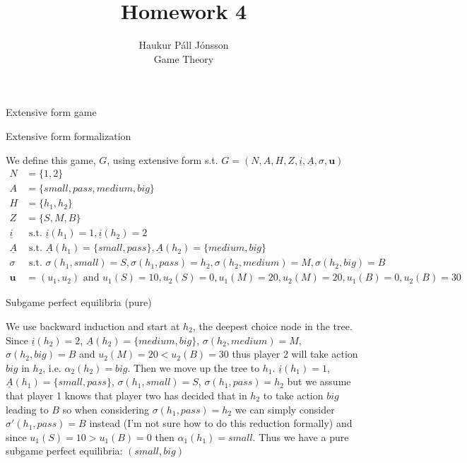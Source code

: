 \documentclass[12pt]{article}
\newenvironment{question}[2][Question]{\begin{trivlist}
\item[\hskip \labelsep {\bfseries #1}\hskip \labelsep {\bfseries #2.}]}{\end{trivlist}}
\newenvironment{answer}[2][Answer]{\begin{trivlist}
\item[\hskip \labelsep {\bfseries #1}\hskip \labelsep {\bfseries #2:}]}{\end{trivlist}}
\begin{document}
\let\oldsum\sum
\renewcommand{\sum}[3]{\oldsum\limits_{#1}^{#2}#3}
\let\oldprod\prod
\renewcommand{\prod}[3]{\oldprod\limits_{#1}^{#2}#3}

\title{Homework 4}
\author{Haukur Páll Jónsson\\
Game Theory}

\maketitle

\begin{question}{1}
Extensive form game
\end{question}
\begin{answer}{a)}{Extensive form formalization}

We define this game, $G$, using extensive form s.t. $G=(N, A, H, Z, \underline{i}, \underline{A}, \sigma, \boldsymbol{u})$
\begin{align*}
N&=\{1,2\} \\
A&=\{small,pass,medium, big\} \\
H&=\{h_1,h_2\} \\
Z&=\{S,M,B\}  \\
\underline{i}& \text{ s.t. } \underline{i}(h_1)=1, \underline{i}(h_2)=2  \\
\underline{A}& \text{ s.t. } \underline{A}(h_1)=\{small,pass\}, \underline{A}(h_2)=\{medium,big\} \\
\sigma& \text{ s.t. } \sigma(h_1,small)=S, \sigma(h_1,pass)=h_2, \sigma(h_2,medium)=M, \sigma(h_2,big)=B \\
\boldsymbol{u}&=(u_1,u_2) \text{ and } u_1(S)=10, u_2(S)=0, u_1(M)=20, u_2(M)=20, u_1(B)=0, u_2(B)=30
\end{align*}
\end{answer}
\begin{answer}{b)}{Subgame perfect equilibria (pure)}

We use backward induction and start at $h_2$, the deepest choice node in the tree. Since $\underline{i}(h_2)=2$, $\underline{A}(h_2)=\{medium,big\}$, $\sigma(h_2,medium)=M$, $\sigma(h_2,big)=B$ and $u_2(M)=20 < u_2(B)=30$ thus player 2 will take action $big$ in $h_2$, i.e. $\alpha_2(h_2)=big$. Then we move up the tree to $h_1$. $\underline{i}(h_1)=1$, $\underline{A}(h_1)=\{small,pass\}$, $\sigma(h_1,small)=S$, $\sigma(h_1,pass)=h_2$ but we assume that player 1 knows that player two has decided that in $h_2$ to take action $big$ leading to $B$ so when considering $\sigma(h_1,pass)=h_2$ we can simply consider $\sigma'(h_1,pass)=B$ instead (I'm not sure how to do this reduction formally) and since $u_1(S)=10 > u_1(B)=0$ then $\alpha_1(h_1)=small$. Thus we have a pure subgame perfect equilibria: $(small,big)$
\end{answer}
\end{document}

